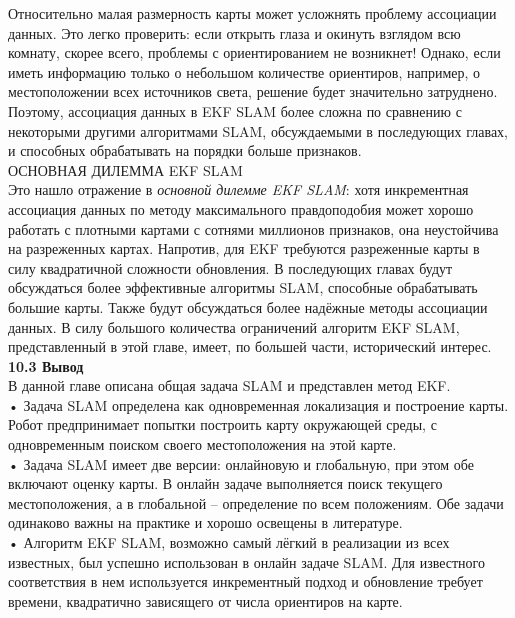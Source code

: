 \documentclass[10pt,a4paper]{article}
\begin{document}
Относительно малая размерность карты может усложнять проблему ассоциации данных. Это легко проверить: если открыть глаза и окинуть взглядом всю комнату, скорее всего, проблемы с ориентированием не возникнет! Однако, если иметь информацию только о небольшом количестве ориентиров,  например, о местоположении всех источников света, решение будет значительно затруднено. Поэтому, ассоциация данных в EKF SLAM более сложна по сравнению с некоторыми другими алгоритмами SLAM, обсуждаемыми в последующих главах, и способных обрабатывать на порядки больше признаков.\\ 
ОСНОВНАЯ ДИЛЕММА EKF SLAM\\
Это нашло отражение в \textit{основной дилемме EKF SLAM}: хотя инкрементная ассоциация данных по методу максимального правдоподобия может хорошо работать с плотными картами с сотнями миллионов признаков, она неустойчива на разреженных картах. Напротив, для EKF требуются разреженные карты в силу квадратичной сложности обновления. В последующих главах будут обсуждаться более эффективные алгоритмы SLAM, способные обрабатывать большие карты. Также будут обсуждаться более надёжные методы ассоциации данных. В силу большого количества ограничений  алгоритм EKF SLAM, представленный в этой главе, имеет, по большей части, исторический интерес.\\

\textbf{10.3	Вывод}\\

В данной главе описана общая задача SLAM и представлен метод EKF.\\

•	Задача SLAM определена как одновременная локализация и построение карты. Робот предпринимает попытки построить карту окружающей среды, с одновременным поиском своего местоположения на этой карте.\\

•	Задача SLAM имеет две версии: онлайновую и глобальную, при этом обе включают оценку карты. В онлайн задаче выполняется поиск текущего местоположения, а в глобальной – определение по всем положениям. Обе задачи одинаково важны на практике и хорошо освещены в литературе.\\

•	Алгоритм EKF SLAM, возможно самый лёгкий в реализации из всех известных, был успешно использован в онлайн задаче SLAM. Для известного соответствия в нем используется инкрементный подход и обновление требует времени, квадратично зависящего от числа ориентиров на карте.\\
\end{document}
